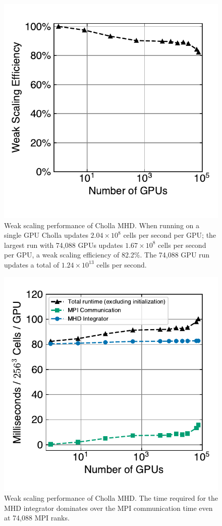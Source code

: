 \begin{figure}[ht!]
    \includegraphics[width=0.5\linewidth]{assets/3-mhd-tests/scaling_tests_weak_efficiency.pdf}
    \caption{Weak scaling performance of Cholla MHD. When running on a single GPU Cholla updates $2.04\times10^8$ cells per second per GPU; the largest run with 74,088 GPUs updates $1.67\times10^8$ cells per second per GPU, a weak scaling efficiency of 82.2\%. The 74,088 GPU run updates a total of $1.24\times10^{13}$ cells per second. }
    \label{fig:scaling-weak-efficiency}
\end{figure}

\begin{figure}[ht!]
    \includegraphics[width=0.5\linewidth]{assets/3-mhd-tests/scaling_tests_ms_per_gpu.pdf}
    \caption{Weak scaling performance of Cholla MHD. The time required for the MHD integrator dominates over the MPI communication time even at 74,088 MPI ranks. }
    \label{fig:scaling-ms-per-gpu}
\end{figure}